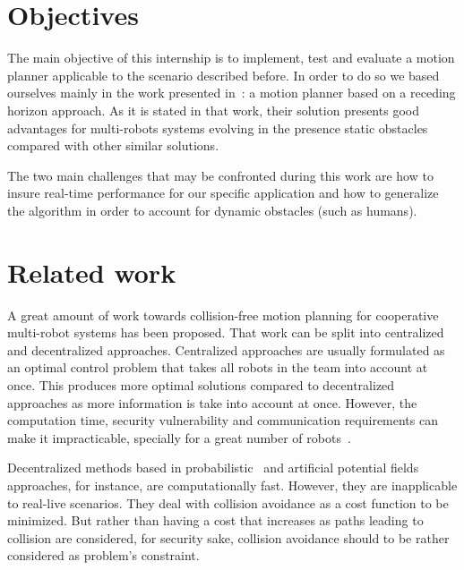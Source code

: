 
\section{Objectives}

The main objective of this internship is to implement, test and evaluate a motion planner applicable to the scenario described before. In order to do so we based ourselves mainly in the work presented in~\cite{Defoort2007a}: a motion planner based on a receding horizon approach. As it is stated in that work, their solution presents good advantages for multi-robots systems evolving in the presence static obstacles compared with other similar solutions.

The two main challenges that may be confronted during this work are how to insure real-time performance for our specific application and how to generalize the algorithm in order to account for dynamic obstacles (such as humans).


\section{Related work}

A great amount of work towards collision-free motion 
planning for cooperative multi-robot systems has been proposed. That work can
be split into centralized and decentralized approaches.
Centralized approaches are usually formulated as an optimal
control problem that takes all robots in the team into account at once.
This produces more optimal solutions compared to decentralized approaches as more information 
is take into account at once. However, the computation time, security vulnerability and communication 
requirements can make it impracticable, specially for a great number of 
robots~\cite{Borrelli2006}.

Decentralized methods based in probabilistic~\cite{Sanchez2002} and artificial 
potential fields~\cite{Khatib1986} approaches, for instance, are computationally fast.
However, they are inapplicable to real-live scenarios. They deal with collision avoidance as a cost function to be minimized. But rather than having a cost that increases as paths leading
to collision are considered, for security sake, collision avoidance should to be rather considered as problem's constraint.

